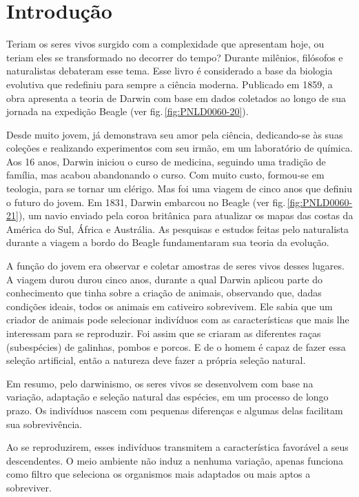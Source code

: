 \documentclass[11pt]{extarticle}
\begin{document}
\tableofcontents

\section{Introdução}

Teriam os seres vivos surgido com a complexidade que apresentam hoje, ou teriam
eles se transformado no decorrer do tempo?
Durante milênios, filósofos e naturalistas debateram esse tema.
Esse livro é considerado a base da biologia evolutiva que redefiniu para sempre
a ciência moderna. Publicado em 1859, a obra apresenta a teoria de Darwin com base em dados coletados ao longo de sua jornada na expedição Beagle (ver fig.\,\ref{fig:PNLD0060-20}). 


Desde muito jovem, já demonstrava seu amor pela ciência, dedicando-se às suas
coleções e realizando experimentos com seu irmão, em um laboratório de
química. Aos 16 anos, Darwin iniciou o curso de medicina,  seguindo uma tradição de família, mas acabou abandonando o curso.
Com muito custo, formou-se em teologia, para se tornar um clérigo.  Mas foi uma
viagem de cinco anos que definiu o futuro do jovem.  Em 1831, Darwin embarcou
no Beagle (ver fig.\,\ref{fig:PNLD0060-21}), um navio enviado pela coroa britânica para atualizar os mapas das costas da América do Sul,  África e Austrália.
As pesquisas e estudos feitas pelo naturalista durante a viagem a bordo do
Beagle fundamentaram sua teoria da evolução.


A função do jovem era observar e coletar amostras de seres vivos desses
lugares. A viagem durou 
durou cinco anos, durante a qual Darwin aplicou parte do conhecimento que tinha sobre a criação de animais, observando que, dadas condições ideais, todos os animais em cativeiro
sobrevivem. Ele sabia que um criador de animais pode selecionar indivíduos com as características que mais lhe interessam para se reproduzir.
Foi assim que se criaram as diferentes raças (subespécies) de galinhas, pombos
e porcos. E de o homem é capaz de fazer essa seleção artificial, então a natureza deve fazer a própria seleção natural.

Em resumo, pelo darwinismo, os seres vivos se desenvolvem com base na variação,
adaptação e seleção natural das espécies, em um processo de longo prazo.
Os indivíduos nascem com pequenas diferenças e algumas delas facilitam sua
sobrevivência.

Ao se reproduzirem, esses indivíduos transmitem a característica favorável
a seus descendentes. O meio ambiente não induz a nenhuma variação, apenas funciona como filtro que
seleciona os organismos mais adaptados ou mais aptos a sobreviver.
\end{document}

